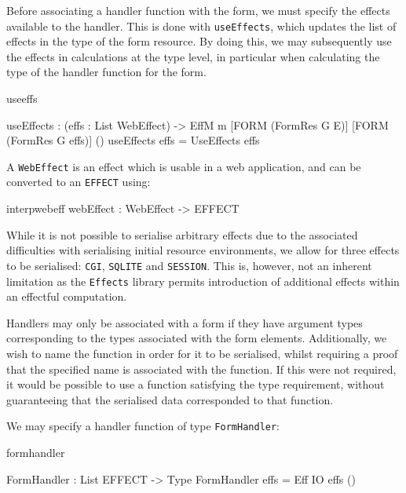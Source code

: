 Before associating a handler function with the form, we must specify the
effects available to the handler. This is done with
\texttt{useEffects}, which updates the list of effects in the type of the form
resource. By doing this, we may subsequently use the effects in calculations at
the type level, in particular when calculating the type of the handler function
for the form. 

\begin{SaveVerbatim}{useeffs}

useEffects : (effs : List WebEffect) ->
             EffM m [FORM (FormRes G E)] 
                    [FORM (FormRes G effs)] ()
useEffects effs = UseEffects effs

\end{SaveVerbatim}

\noindent
A \texttt{WebEffect} is an effect which is usable in a web application, and can
be converted to an \texttt{EFFECT} using:

\begin{SaveVerbatim}{interpwebeff}
webEffect : WebEffect -> EFFECT
\end{SaveVerbatim}

While it is not possible to serialise arbitrary effects due to the associated
difficulties with serialising initial resource environments, we allow for three
effects to be serialised: \texttt{CGI}, \texttt{SQLITE} and \texttt{SESSION}.
This is, however, not an inherent limitation as the \texttt{Effects} library
permits introduction of additional effects within an effectful computation.

Handlers may only be associated with a form if they have argument types
corresponding to the types associated with the form elements. Additionally, we
wish to name the function in order for it to be serialised, whilst requiring a
proof that the specified name is associated with the function. If this were not
required, it would be possible to use a function satisfying the type
requirement, without guaranteeing that the serialised data corresponded to
that function.

We may specify a handler function of type \texttt{FormHandler}:

\begin{SaveVerbatim}{formhandler}

FormHandler : List EFFECT -> Type
FormHandler effs = Eff IO effs ()

\end{SaveVerbatim}

